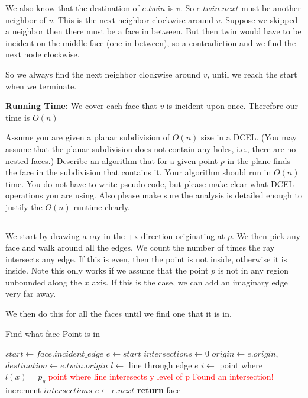 \documentclass[11pt]{article}
\begin{document}
We also know that the destination of $e.twin$ is $v$. So $e.twin.next$ must be another neighbor of $v$.
This is the next neighbor clockwise around $v$. Suppose we skipped a neighbor then there must be a face in between.
But then twin would have to be incident on the middle face (one in between), so a contradiction and we find the next node clockwise.

So we always find the next neighbor clockwise around $v$, until we reach the start when we terminate.

\textbf{Running Time:} We cover each face that $v$ is incident upon once. Therefore our time is $O(n)$





Assume you are given a planar subdivision of $O(n)$ size in a DCEL. (You may
assume that the planar subdivision does not contain any holes, i.e., there are
no nested faces.) Describe an algorithm that for a given point $p$ in the plane
finds the face in the subdivision that contains it. Your algorithm should run in
$O(n)$ time. You do not have to write pseudo-code, but please make clear what
DCEL operations you are using. Also please make sure the analysis is detailed
enough to justify the $O(n)$ runtime clearly.

\hrule


We start by drawing a ray in the +x direction originating at $p$.
We then pick any face and walk around all the edges. We count the number of times
the ray intersects any edge. If this is even, then the point is not inside, otherwise it is inside.
Note this only works if we assume that the point $p$ is not in any region unbounded along the $x$ axis.
If this is the case, we can add an imaginary edge very far away. 

We then do this for all the faces until we find one that it is in.

\begin{algorithm}
    \caption{Find what face Point is in}
    \label{alg:point}
    \begin{algorithmic}[1]
            \State $start \gets face.incident\_edge$
            \State $e \gets start$
            \State $intersections \gets 0$
            \Do
                \State $origin \gets e.origin$, $destination \gets e.twin.origin$
                \State $l \gets$ line through edge $e$
                \State $i \gets $ point where $l(x) = p_y$ \textcolor{red}{point where line interesects y level of p}
                    \State \textcolor{red}{Found an intersection!}
                    \State increment $intersections$
                \EndIf
                \State $e \gets e.next$
                \State \textbf{return} face
            \EndIf
        \EndFor
    \EndFunction
    \end{algorithmic}
\end{algorithm}
\end{document}
